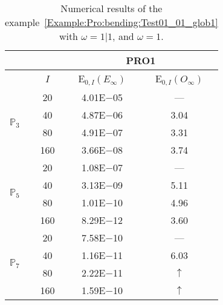 \begin{table}[H]
\caption{Numerical results of the example~\ref{Example:Pro:bending:Test01_01_glob1} with $\omega=1|1$, and $\omega=1$.}
\setlength{\tabcolsep}{5pt}
\centering
\begin{tabular}{@{}l c c c@{}}
\toprule
 &  & \multicolumn{2}{c}{PRO1}\\
\midrule
 & $I$ & E$_{0,I}(E_{\infty})$ & E$_{0,I}(O_{\infty})$\\
\midrule
\multirow{4}{*}{$\mathbb{P}_{3}$} & 20 & 4.01E$-$05 & ---\\
 & 40 & 4.87E$-$06 & 3.04\\
 & 80 & 4.91E$-$07 & 3.31\\
 & 160 & 3.66E$-$08 & 3.74\\
\midrule
\multirow{4}{*}{$\mathbb{P}_{5}$} & 20 & 1.08E$-$07 & ---\\
 & 40 & 3.13E$-$09 & 5.11\\
 & 80 & 1.01E$-$10 & 4.96\\
 & 160 & 8.29E$-$12 & 3.60\\
\midrule
\multirow{4}{*}{$\mathbb{P}_{7}$} & 20 & 7.58E$-$10 & ---\\
 & 40 & 1.16E$-$11 & 6.03\\
 & 80 & 2.22E$-$11 & $\uparrow$\\
 & 160 & 1.59E$-$10 & $\uparrow$\\
\bottomrule
\end{tabular}
\label{Table:PRO:test_01_01_test20}
\end{table}
